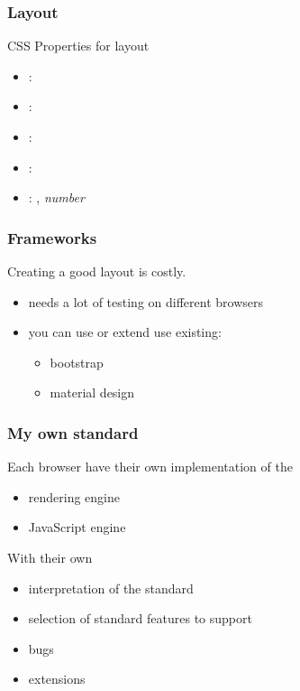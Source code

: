 \begin{frame}[fragile]
\frametitle{Layout}
\color{structure}
CSS Properties for layout
\begin{itemize}
  \item {}: 
  \item {}: 
  \item {}: 
  \item {}: 
  \item {}: , \it{number}
\end{itemize}
\end{frame}

\begin{frame}[fragile]
\frametitle{Frameworks}
\color{structure}
Creating a good layout is costly. 
\begin{itemize}\color{structure}
  \item needs a lot of testing on different browsers
  \item you can use or extend use existing:
  \begin{itemize}
    \item bootstrap
    \item material design
  \end{itemize}
\end{itemize}
\end{frame}

\begin{frame}[fragile]
\frametitle{My own standard}
\color{structure}
Each browser have their own implementation of the
\begin{itemize}\color{structure}
  \item rendering engine
  \item JavaScript engine
\end{itemize}
\vspace{5mm}
With their own
\begin{itemize}\color{structure}
  \item interpretation of the standard
  \item selection of standard features to support
  \item bugs
  \item extensions
\end{itemize}
\end{frame}

